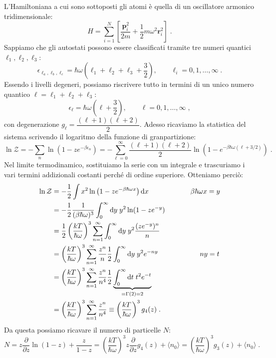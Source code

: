 \documentclass[10pt,a4paper]{report}
\theoremstyle{definition}
\numberwithin{equation}{section}
\newcommand{\diff}[1][]{\mathrm{d}#1}
\newcommand{\bra}{\langle}
\newcommand{\ket}{\rangle}
\newcommand{\zpart}{\mathcal{Z}}
\begin{document}
L'Hamiltoniana a cui sono sottoposti gli atomi è quella di un oscillatore armonico tridimensionale:
\begin{equation}
H=\sum_{i=1}^N\left[\frac{\mathbf{p}_i^2}{2m}+\frac{1}{2}m\omega^2\mathbf{r}_i^2\right]\;.
\end{equation}
Sappiamo che gli autostati possono essere classificati tramite tre numeri quantici $\ell_1,\ell_2,\ell_3$:
$$
\epsilon_{\ell_a,\ell_b,\ell_c}=\hbar\omega\left(\ell_1+\ell_2+\ell_3+\frac{3}{2}\right),\qquad \ell_i=0,1,\ldots,\infty\;.
$$
Essendo i livelli degeneri, possiamo riscrivere tutto in termini di un unico numero quantico $\ell=\ell_1+\ell_2+\ell_3$:
\begin{equation}
\epsilon_{\ell}=\hbar\omega\left(\ell+\frac{3}{2}\right),\qquad \ell=0,1,\ldots,\infty\;,
\end{equation}
con degenerazione $g_{\ell}=\dfrac{(\ell+1)(\ell+2)}{2}$. Adesso ricaviamo la statistica del sistema scrivendo il logaritmo della funzione di granpartizione:
\begin{equation}
\ln\zpart=-\sum_n\ln(1-ze^{-\beta\epsilon_n})=-\sum_{\ell=0}^{\infty}\frac{(\ell+1)(\ell+2)}{2}\ln(1-e^{-\beta\hbar\omega(\ell+3/2)})\;.
\end{equation}
Nel limite termodinamico, sostituiamo la serie con un integrale e trascuriamo i vari termini addizionali costanti perché di ordine superiore. Otteniamo perciò:
\begin{align}
\ln\zpart &= -\frac{1}{2}\int x^2\ln\left(1-ze^{-\beta\hbar\omega x}\right)\diff{x}\qquad\qquad\qquad \beta\hbar\omega x=y \notag \\
&= -\frac{1}{2}\frac{1}{(\beta\hbar\omega)^3}\int_0^{\infty}\diff{y}\; y^2\ln(1-ze^{-y}) \notag \\
&= \frac{1}{2}\left(\frac{kT}{\hbar\omega}\right)^3\sum_{n=1}^{\infty}\int_0^{\infty}\diff{y}\;y^2\frac{(ze^{-y})^n}{n} \notag \\
&= \left(\frac{kT}{\hbar\omega}\right)^3\sum_{n=1}^{\infty}\frac{z^n}{n}\frac{1}{2}\int_0^{\infty}\diff{y}\; y^2 e^{-ny} \qquad\qquad\qquad ny=t \notag \\
&=\left(\frac{kT}{\hbar\omega}\right)^3\sum_{n=1}^{\infty}\frac{z^n}{n^4}\frac{1}{2}\underbrace{\int_0^{\infty}\diff{t}\; t^2e^{-t}}_{=\Gamma(2)=2} \notag \\
&=\left(\frac{kT}{\hbar\omega}\right)^3\sum_{n=1}^{\infty}\frac{z^n}{n^4}\equiv \left(\frac{kT}{\hbar\omega}\right)^3 g_4(z)\;.
\end{align}
Da questa possiamo ricavare il numero di particelle $N$:
\begin{equation}
N=z\frac{\partial}{\partial z}\ln(1-z)+\frac{z}{1-z}=\left(\frac{kT}{\hbar\omega}\right)^3 z\frac{\partial}{\partial z}g_4(z)+\bra n_0\ket=\left(\frac{kT}{\hbar\omega}\right)^3g_3(z)+\bra n_0\ket\;.
\end{equation}
\end{document}
